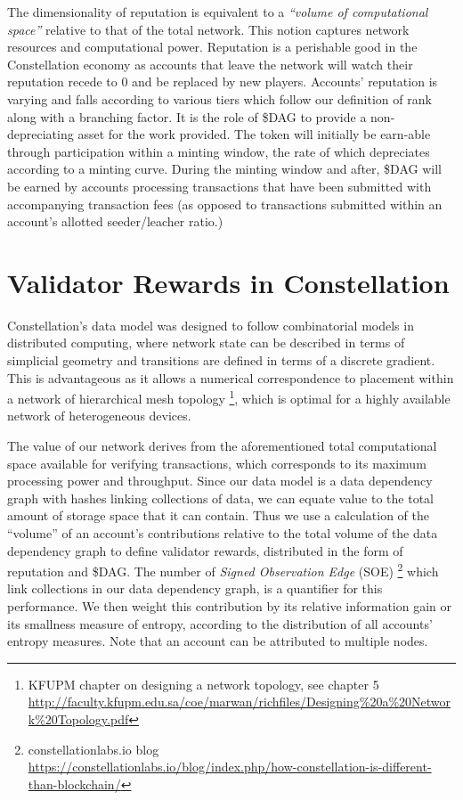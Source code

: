 \documentclass{article}
\begin{document}
The dimensionality of reputation is equivalent to a {\emph{``volume of computational space''}} relative to that of the total network. This notion captures network resources and computational power. Reputation is a perishable good in the Constellation economy as accounts that leave the network will watch their reputation recede to $0$ and be replaced by new players. Accounts' reputation is varying and falls according to various tiers which follow our definition of rank along with a branching factor. It is the role of \$DAG to provide a non-depreciating asset for the work provided. The token will initially be earn-able through participation within a minting window, the rate of which depreciates according to a minting curve. During the minting window and after, \$DAG will be earned by accounts processing transactions that have been submitted with accompanying transaction fees (as opposed to transactions submitted within an account's allotted seeder/leacher ratio.)

\section{Validator Rewards in Constellation}
Constellation's data model was designed to follow combinatorial models in distributed computing, where network state can be described in terms of simplicial geometry and transitions are defined in terms of a discrete gradient. This is advantageous as it allows a numerical correspondence to placement within a network of hierarchical mesh topology
\footnote{KFUPM chapter on designing a network topology, see chapter 5\\ \url{http://faculty.kfupm.edu.sa/coe/marwan/richfiles/Designing\%20a\%20Network\%20Topology.pdf}}, 
which is optimal for a highly available network of heterogeneous devices.

The value of our network derives from the aforementioned total computational space available for verifying transactions, which corresponds to its maximum processing power and throughput. Since our data model is a data dependency graph with hashes linking collections of data, we can equate value to the total amount of storage space that it can contain. Thus we use a calculation of the ``volume'' of an account's contributions relative to the total volume of the data dependency graph to define validator rewards, distributed in the form of reputation and \$DAG. The number of {\emph{Signed Observation Edge}} (SOE)
\footnote{constellationlabs.io blog\\ \url{https://constellationlabs.io/blog/index.php/how-constellation-is-different-than-blockchain/}} 
which link collections in our data dependency graph, is a quantifier for this performance. We then weight this contribution by its relative information gain or its smallness measure of entropy, according to the distribution of all accounts' entropy measures. Note that an account can be attributed to multiple nodes.
\end{document}
